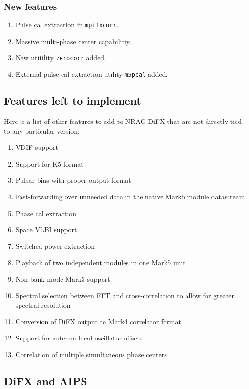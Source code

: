 \subsubsection{New features}

\begin{enumerate}
\item Pulse cal extraction in {\tt mpifxcorr}.
\item Massive multi-phase center capabilitiy.
\item New utitility {\tt zerocorr} added.
\item External pulse cal extraction utility {\tt m5pcal} added.
\end{enumerate}

\subsection{Features left to implement}

Here is a list of other features to add to NRAO-DiFX that are not directly tied to any particular version:
\begin{enumerate}
\item VDIF support
\item Support for K5 format
\item Pulsar bins with proper output format
\item Fast-forwarding over unneeded data in the native Mark5 module datastream
\item Phase cal extraction
\item Space VLBI support
\item Switched power extraction
\item Playback of two independent modules in one Mark5 unit
\item Non-bank-mode Mark5 support
\item Spectral selection between FFT and cross-correlation to allow for greater spectral resolution
\item Conversion of DiFX output to Mark4 correlator format
\item Support for antenna local oscillator offsets
\item Correlation of multiple simultaneous phase centers
\end{enumerate}

\subsection{DiFX and AIPS}

